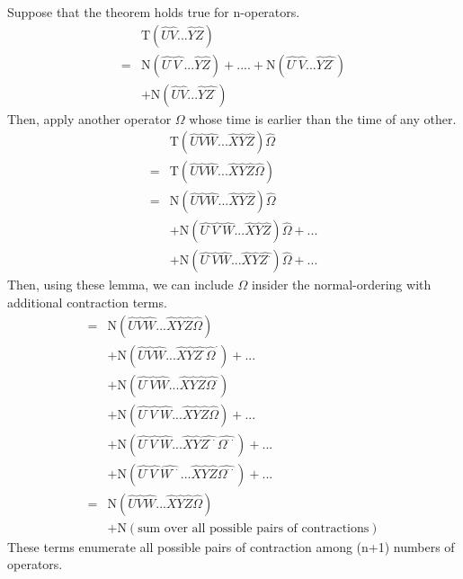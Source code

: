 ﻿\documentclass[twoside]{book}
\numberwithin{equation}{section}
\begin{document}
Suppose that the theorem holds true for n-operators.
\begin{align}
&\mathrm{T}(\hat{U}\hat{V}...\hat{Y}\hat{Z}) \nonumber \\
=&\mathrm{N}(\hat{U^{\cdot}}\hat{V^{\cdot}}...\hat{Y}\hat{Z})+....+\mathrm{N}(\hat{U^{\cdot}}\hat{V}...\hat{Y}\hat{Z^{\cdot}})\nonumber \\
&+\mathrm{N}(\hat{U}\hat{V}...\hat{Y}\hat{Z^{\cdot}})\nonumber
\end{align}
Then, apply another operator $\Omega$ whose time is earlier than the time of any other.
\begin{align}
&\mathrm{T}(\hat{U}\hat{V}\hat{W}...\hat{X}\hat{Y}\hat{Z})\hat{\Omega} \nonumber \\
=&\mathrm{T}(\hat{U}\hat{V}\hat{W}...\hat{X}\hat{Y}\hat{Z}\hat{\Omega}) \nonumber \\
=&\mathrm{N}(\hat{U}\hat{V}\hat{W}...\hat{X}\hat{Y}\hat{Z})\hat{\Omega}\nonumber \\
&+\mathrm{N}(\hat{U^{\cdot}}\hat{V^{\cdot}}\hat{W}...\hat{X}\hat{Y}\hat{Z})\hat{\Omega}+...\nonumber \\
&+\mathrm{N}(\hat{U^{\cdot}}\hat{V}\hat{W}...\hat{X}\hat{Y}\hat{Z^{\cdot}})\hat{\Omega}+...\nonumber
\end{align}
Then, using these lemma, we can include $\Omega$ insider the normal-ordering with additional contraction terms.
\begin{align}
=&\mathrm{N}(\hat{U}\hat{V}\hat{W}...\hat{X}\hat{Y}\hat{Z}\hat{\Omega})\nonumber \\
&+\mathrm{N}(\hat{U}\hat{V}\hat{W}...\hat{X}\hat{Y}\hat{Z^{\cdot}}\hat{\Omega}^{\cdot})+...\nonumber \\
&+\mathrm{N}(\hat{U^{\cdot}}\hat{V}\hat{W}...\hat{X}\hat{Y}\hat{Z}\hat{\Omega^{\cdot}})\nonumber \\
&+\mathrm{N}(\hat{U^{\cdot}}\hat{V^{\cdot}}\hat{W}...\hat{X}\hat{Y}\hat{Z}\hat{\Omega})+...\nonumber \\
&+\mathrm{N}(\hat{U^{\cdot}}\hat{V^{\cdot}}\hat{W}...\hat{X}\hat{Y}\hat{Z^{\cdot\cdot}}\hat{\Omega^{\cdot\cdot}})+...\nonumber \\
&+\mathrm{N}(\hat{U^{\cdot}}\hat{V^{\cdot}}\hat{W^{\cdot\cdot}}...\hat{X}\hat{Y}\hat{Z}\hat{\Omega^{\cdot\cdot}})+...\nonumber \\
=&\mathrm{N}(\hat{U}\hat{V}\hat{W}...\hat{X}\hat{Y}\hat{Z}\hat{\Omega})\nonumber \\
&+\mathrm{N}(\text{sum over all possible pairs of contractions})\nonumber 
\end{align}
These terms enumerate all possible pairs of contraction among (n+1) numbers of operators.
\end{document}
